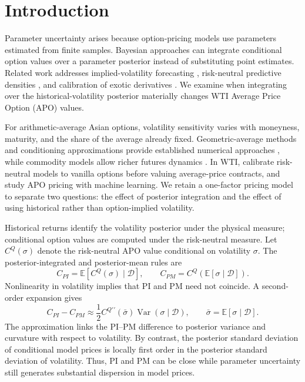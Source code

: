 \section{Introduction}\label{sec:introduction}

Parameter uncertainty arises because option-pricing models use parameters estimated from finite samples. Bayesian approaches can integrate conditional option values over a parameter posterior instead of substituting point estimates. Related work addresses implied-volatility forecasting \cite{guidolin2003}, risk-neutral predictive densities \cite{romboutsstentoft2014}, and calibration of exotic derivatives \cite{guptareisinger2014}. We examine when integrating over the historical-volatility posterior materially changes WTI Average Price Option (APO) values.

For arithmetic-average Asian options, volatility sensitivity varies with moneyness, maturity, and the share of the average already fixed. Geometric-average methods and conditioning approximations provide established numerical approaches \cite{kemnavorst1990,curran1994}, while commodity models allow richer futures dynamics \cite{schwartz1997,ewaldwu2023}. In WTI, \cite{shirayatakahashi2011} calibrate risk-neutral models to vanilla options before valuing average-price contracts, and \cite{ganwangyang2020} study APO pricing with machine learning. We retain a one-factor pricing model to separate two questions: the effect of posterior integration and the effect of using historical rather than option-implied volatility.

Historical returns identify the volatility posterior under the physical measure; conditional option values are computed under the risk-neutral measure. Let \(C^Q(\sigma)\) denote the risk-neutral APO value conditional on volatility \(\sigma\). The posterior-integrated and posterior-mean rules are
\begin{equation}
 C_{PI}=\mathbb E[C^Q(\sigma)\mid\mathcal D],
 \qquad
 C_{PM}=C^Q(\mathbb E[\sigma\mid\mathcal D]).
 \label{eq:intro_rules}
\end{equation}
Nonlinearity in volatility implies that PI and PM need not coincide. A second-order expansion gives
\begin{equation}
 C_{PI}-C_{PM}
 \approx
 \frac12 C^{Q\prime\prime}(\bar\sigma)
 \operatorname{Var}(\sigma\mid\mathcal D),
 \qquad
 \bar\sigma=\mathbb E[\sigma\mid\mathcal D].
 \label{eq:intro_taylor}
\end{equation}
The approximation links the PI--PM difference to posterior variance and curvature with respect to volatility. By contrast, the posterior standard deviation of conditional model prices is locally first order in the posterior standard deviation of volatility. Thus, PI and PM can be close while parameter uncertainty still generates substantial dispersion in model prices.

